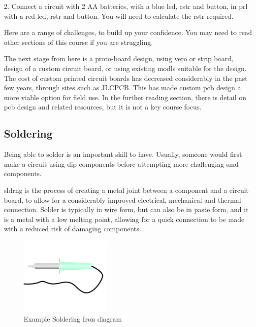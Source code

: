 \documentclass[a4paper,11pt]{report}
\begin{document}
2. Connect a circuit with 2 AA batteries, with a blue \gls{led}, \gls{rstr} and button, in \gls{prl} with a red \gls{led}, \gls{rstr} and button. You will need to calculate the \gls{rstr} required.

Here are a range of challenges, to build up your confidence. You may need to read other sections of this course if you are struggling.

The next stage from here is a proto-board design, using vero or strip board, design of a custom circuit board, or using existing \gls{modl}s suitable for the design. The cost of custom printed circuit boards has decreased considerably in the past few years, through sites such as JLCPCB. This has made custom \gls{pcb} design a more viable option for field use.
In the further reading section, there is detail on \gls{pcb} design and related resources, but it is not a key course focus.

\vspace*{1\baselineskip}

\subsection{Soldering}

Being able to solder is an important skill to have. Usually, someone would first make a circuit using \gls{dip} components before attempting more challenging \gls{smd} components.

\gls{sldrng} is the process of creating a metal joint between a component and a circuit board, to allow for a considerably improved electrical, mechanical and thermal connection. Solder is typically in wire form, but can also be in paste form, and it is a metal with a low melting point, allowing for a quick connection to be made with a reduced risk of damaging components.

\begin{figure}[H]
\centering
\includegraphics[width=0.4\textwidth]{solderingiron}
\caption{Example Soldering Iron diagram}
\end{figure}
\end{document}
